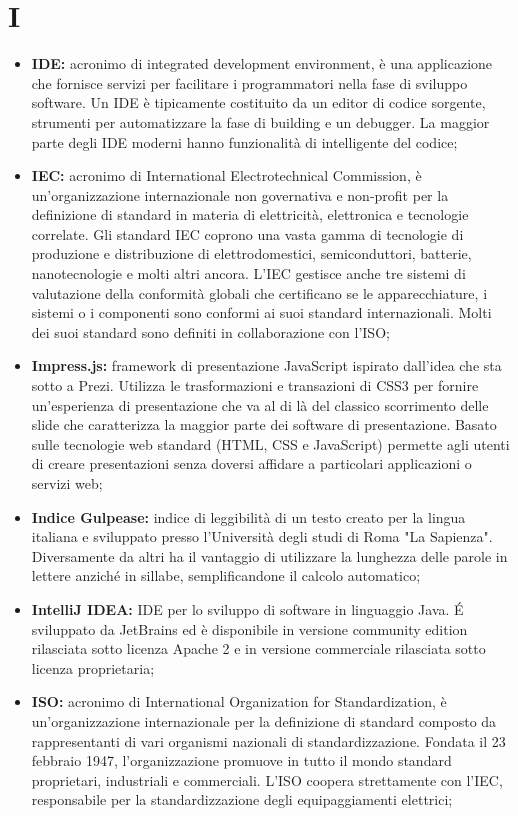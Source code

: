 \section*{I} %
\label{sec:i}
	\begin{itemize}
		\item \textbf{IDE:} acronimo di integrated development environment, è una applicazione che fornisce servizi per facilitare i programmatori nella fase di sviluppo software. Un IDE è tipicamente costituito da un editor di codice sorgente, strumenti per automatizzare la fase di building e un debugger. La maggior parte degli IDE moderni hanno funzionalità di intelligente del codice;
		\item \textbf{IEC:} acronimo di International Electrotechnical Commission, è un'organizzazione internazionale non governativa e non-profit per la definizione di standard in materia di elettricità, elettronica e tecnologie correlate. Gli standard IEC coprono una vasta gamma di tecnologie di produzione e distribuzione di elettrodomestici, semiconduttori, batterie, nanotecnologie e molti altri ancora. L'IEC gestisce anche tre sistemi di valutazione della conformità globali che certificano se le apparecchiature, i sistemi o i componenti sono conformi ai suoi standard internazionali. Molti dei suoi standard sono definiti in collaborazione con l'ISO;
		\item \textbf{Impress.js:} framework di presentazione JavaScript ispirato dall'idea che sta sotto a Prezi. Utilizza le trasformazioni e transazioni di CSS3 per fornire un'esperienza di presentazione che va al di là del classico scorrimento delle slide che caratterizza la maggior parte dei software di presentazione. Basato sulle tecnologie web standard (HTML, CSS e JavaScript) permette agli utenti di creare presentazioni senza doversi affidare a particolari applicazioni o servizi web;
		\item \textbf{Indice Gulpease:} indice di leggibilità di un testo creato per la lingua italiana e sviluppato presso l'Università degli studi di Roma "La Sapienza". Diversamente da altri ha il vantaggio di utilizzare la lunghezza delle parole in lettere anziché in sillabe, semplificandone il calcolo automatico;
		\item \textbf{IntelliJ IDEA:} IDE per lo sviluppo di software in linguaggio Java. É sviluppato da JetBrains ed è disponibile in versione community edition rilasciata sotto licenza Apache 2 e in versione commerciale rilasciata sotto licenza proprietaria;
		\item \textbf{ISO:} acronimo di International Organization for Standardization, è un'organizzazione internazionale per la definizione di standard composto da rappresentanti di vari organismi nazionali di standardizzazione. Fondata il 23 febbraio 1947, l'organizzazione promuove in tutto il mondo standard proprietari, industriali e commerciali. L'ISO coopera strettamente con l'IEC, responsabile per la standardizzazione degli equipaggiamenti elettrici;
	\end{itemize}
\pagebreak

